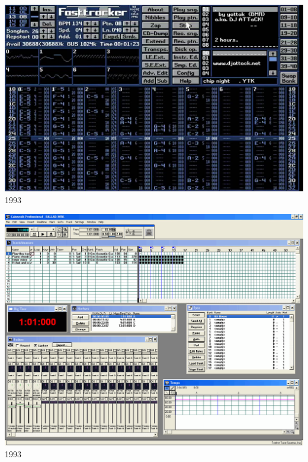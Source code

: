 \documentclass{beamer}
\begin{document}
\begin{frame}
  \begin{center}
    \includegraphics[scale=0.277]{images/fasttracker2.jpg}\\
    1993
  \end{center}
\end{frame}

\begin{frame}
  \begin{center}
    \includegraphics[scale=0.201]{images/cakewalk.png}\\
    1993
  \end{center}
\end{frame}
\end{document}
